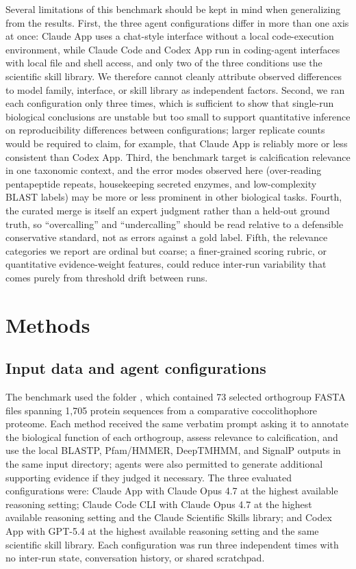 \documentclass[11pt]{article}
\newcommand{\evidencefile}[1]{\path{#1}}
\begin{document}
Several limitations of this benchmark should be kept in mind when generalizing from the results. First, the three agent configurations differ in more than one axis at once: Claude App uses a chat-style interface without a local code-execution environment, while Claude Code and Codex App run in coding-agent interfaces with local file and shell access, and only two of the three conditions use the scientific skill library. We therefore cannot cleanly attribute observed differences to model family, interface, or skill library as independent factors. Second, we ran each configuration only three times, which is sufficient to show that single-run biological conclusions are unstable but too small to support quantitative inference on reproducibility differences between configurations; larger replicate counts would be required to claim, for example, that Claude App is reliably more or less consistent than Codex App. Third, the benchmark target is calcification relevance in one taxonomic context, and the error modes observed here (over-reading pentapeptide repeats, housekeeping secreted enzymes, and low-complexity BLAST labels) may be more or less prominent in other biological tasks. Fourth, the curated merge is itself an expert judgment rather than a held-out ground truth, so ``overcalling'' and ``undercalling'' should be read relative to a defensible conservative standard, not as errors against a gold label. Fifth, the relevance categories we report are ordinal but coarse; a finer-grained scoring rubric, or quantitative evidence-weight features, could reduce inter-run variability that comes purely from threshold drift between runs.

\section{Methods}

\subsection{Input data and agent configurations}

The benchmark used the folder \evidencefile{Orthogroups.calcifying\_loose\_fastas}, which contained 73 selected orthogroup FASTA files spanning 1{,}705 protein sequences from a comparative coccolithophore proteome. Each method received the same verbatim prompt asking it to annotate the biological function of each orthogroup, assess relevance to calcification, and use the local BLASTP, Pfam/HMMER, DeepTMHMM, and SignalP outputs in the same input directory; agents were also permitted to generate additional supporting evidence if they judged it necessary. The three evaluated configurations were: Claude App with Claude Opus 4.7 \citep{AnthropicOpus47_2026} at the highest available reasoning setting; Claude Code CLI with Claude Opus 4.7 at the highest available reasoning setting and the Claude Scientific Skills library; and Codex App with GPT-5.4 at the highest available reasoning setting and the same scientific skill library. Each configuration was run three independent times with no inter-run state, conversation history, or shared scratchpad.
\end{document}
